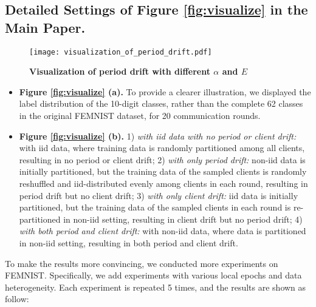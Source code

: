 \subsection{Detailed Settings of Figure \ref{fig:visualize} in the Main Paper.}\label{sec:visualize}
\begin{figure}[hb]
    \centering
   \texttt{[image: visualization\_of\_period\_drift.pdf]}
    \caption{\small \textbf{Visualization of period drift with different $\alpha$ and $E$}}
\end{figure}
\begin{itemize}
    \item \textbf{Figure \ref{fig:visualize} (a).} To provide a clearer illustration, we displayed the label distribution of the 10-digit classes, rather than the complete 62 classes in the original FEMNIST dataset, for 20 communication rounds.
    \item \textbf{Figure \ref{fig:visualize} (b).}  1) \textit{\fedavg with iid data with no period or client drift:} \fedavg with iid data, where training data is randomly partitioned among all clients, resulting in no period or client drift; 2) \textit{\fedavg with only period drift:} non-iid data is initially partitioned, but the training data of the sampled clients is randomly reshuffled and iid-distributed evenly among clients in each round, resulting in period drift but no client drift; 3) \textit{\fedavg with only client drift:} iid data is initially partitioned, but the training data of the sampled clients in each round is re-partitioned in non-iid setting, resulting in client drift but no period drift; 4) \textit{\fedavg with both period and client drift:} \fedavg with non-iid data, where data is partitioned in non-iid setting, resulting in both period and client drift.
\end{itemize}
To make the results more convincing, we conducted more experiments on FEMNIST. Specifically, we add experiments with various local epochs and data heterogeneity. Each experiment is repeated 5 times, and the results are shown as follow:


